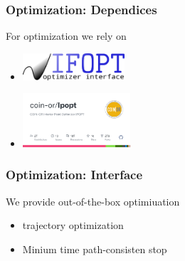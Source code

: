 \begin{frame}[t]
	\frametitle{Optimization: Dependices}

	For optimization we rely on
	\begin{itemize}
		\item \includegraphics[height=1cm]{images/ifopt.png}
		\item \includegraphics[height=2cm]{images/Ipopt.png}
	\end{itemize}
\end{frame}

\begin{frame}[t]
	\frametitle{Optimization: Interface}

	We provide out-of-the-box optimiuation
	\begin{itemize}
		\item trajectory optimization
		\item Minium time path-consisten stop
	\end{itemize}
\end{frame}
